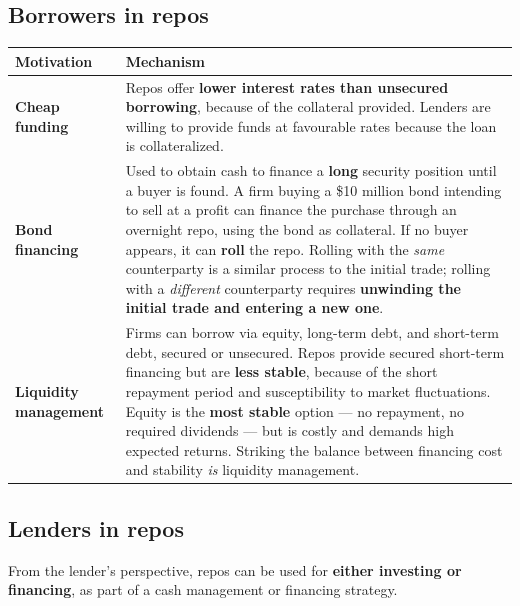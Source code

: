 
\subsection{Borrowers in repos}

\begin{center}
\small
\begin{tabularx}{\textwidth}{@{}p{3.3cm} X@{}}
\toprule
\rowcolor{FRMSoft}\textbf{Motivation} & \textbf{Mechanism} \\
\midrule
\textbf{Cheap funding} & Repos offer \textbf{lower interest rates than unsecured borrowing}, because of the collateral provided. Lenders are willing to provide funds at favourable rates because the loan is collateralized. \\
\addlinespace
\textbf{Bond financing} & Used to obtain cash to finance a \textbf{long} security position until a buyer is found. A firm buying a \$10 million bond intending to sell at a profit can finance the purchase through an overnight repo, using the bond as collateral. If no buyer appears, it can \textbf{roll} the repo. Rolling with the \emph{same} counterparty is a similar process to the initial trade; rolling with a \emph{different} counterparty requires \textbf{unwinding the initial trade and entering a new one}. \\
\addlinespace
\textbf{Liquidity management} & Firms can borrow via equity, long-term debt, and short-term debt, secured or unsecured. Repos provide secured short-term financing but are \textbf{less stable}, because of the short repayment period and susceptibility to market fluctuations. Equity is the \textbf{most stable} option --- no repayment, no required dividends --- but is costly and demands high expected returns. Striking the balance between financing cost and stability \emph{is} liquidity management. \\
\bottomrule
\end{tabularx}
\end{center}

\subsection{Lenders in repos}

From the lender's perspective, repos can be used for \textbf{either investing or financing}, as part of a cash management or financing strategy.

